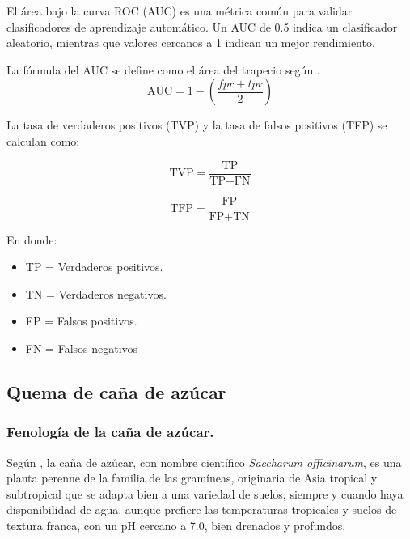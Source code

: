 El área bajo la curva ROC (AUC) es una métrica común para validar clasificadores de aprendizaje automático. Un AUC de 0.5 indica 
un clasificador aleatorio, mientras que valores cercanos a 1 indican un mejor rendimiento. 

La fórmula del AUC se define como el área del trapecio según \citet{DBLP:journals/corr/abs-2010-16061}.
\begin{equation}
    \text{AUC} = 1 - (\frac{fpr + tpr}{2})
    \label{eq:auc}
\end{equation}

La tasa de verdaderos positivos (TVP) y la tasa de falsos positivos (TFP) se calculan como:

\begin{equation}
    \text{TVP} = \frac{\text{TP}}{\text{TP} + \text{FN}}
    \label{eq:tvp}
\end{equation}

\begin{equation}
    \text{TFP} = \frac{\text{FP}}{\text{FP} + \text{TN}}
    \label{eq:tfp}
\end{equation}

En donde:
\begin{itemize}
    \item TP = Verdaderos positivos.
    \item TN = Verdaderos negativos.
    \item FP = Falsos positivos.
    \item FN = Falsos negativos
\end{itemize}

\subsection{Quema de caña de azúcar}

\subsubsection{Fenología de la caña de azúcar.}

Según \citet{helfgott_cultivo_2016}, la caña de azúcar, con nombre científico \textit{Saccharum officinarum}, es una planta perenne de la familia de las gramíneas, originaria de Asia tropical 
y subtropical que se adapta bien a una variedad de suelos, siempre y cuando haya disponibilidad de agua, aunque prefiere las temperaturas tropicales y suelos de 
textura franca, con un pH cercano a 7.0, bien drenados y profundos. 

